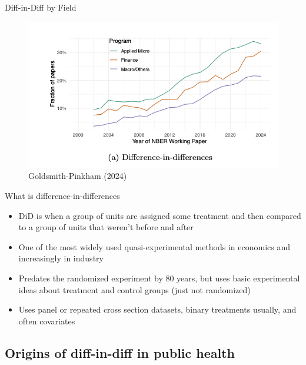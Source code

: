 \documentclass{beamer}
\begin{document}
\begin{frame}{Diff-in-Diff by Field}

	\begin{figure}
	\caption{Goldsmith-Pinkham (2024)}
	\includegraphics[scale=0.75]{./lecture_includes/paul_did}
	\end{figure}

\end{frame}






\begin{frame}{What is difference-in-differences}

\begin{itemize}
\item DiD is when a group of units are assigned some treatment and then compared to a group of units that weren't before and after
\item One of the most widely used quasi-experimental methods in economics and increasingly in industry
\item Predates the randomized experiment by 80 years, but uses basic experimental ideas about treatment and control groups (just not randomized)
\item Uses panel or repeated cross section datasets, binary treatments usually, and often covariates
\end{itemize}
\end{frame}


\subsection{Origins of diff-in-diff in public health}
\end{document}
